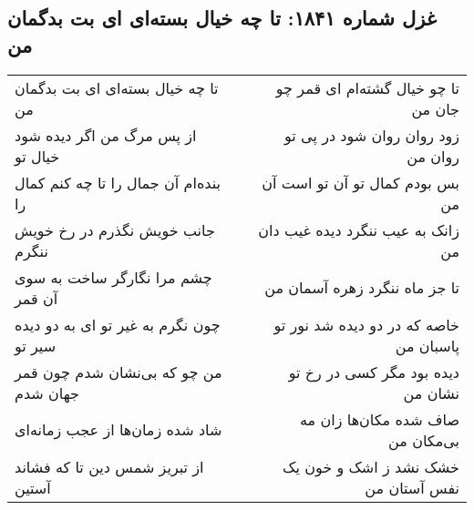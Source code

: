 \begin{center}
\section*{غزل شماره ۱۸۴۱: تا چه خیال بسته‌ای ای بت بدگمان من}
\label{sec:1841}
\begin{longtable}{l p{0.5cm} r}
تا چه خیال بسته‌ای ای بت بدگمان من
&&
تا چو خیال گشته‌ام ای قمر چو جان من
\\
از پس مرگ من اگر دیده شود خیال تو
&&
زود روان روان شود در پی تو روان من
\\
بنده‌ام آن جمال را تا چه کنم کمال را
&&
بس بودم کمال تو آن تو است آن من
\\
جانب خویش نگذرم در رخ خویش ننگرم
&&
زانک به عیب ننگرد دیده غیب دان من
\\
چشم مرا نگارگر ساخت به سوی آن قمر
&&
تا جز ماه ننگرد زهره آسمان من
\\
چون نگرم به غیر تو ای به دو دیده سیر تو
&&
خاصه که در دو دیده شد نور تو پاسبان من
\\
من چو که بی‌نشان شدم چون قمر جهان شدم
&&
دیده بود مگر کسی در رخ تو نشان من
\\
شاد شده زمان‌ها از عجب زمانه‌ای
&&
صاف شده مکان‌ها زان مه بی‌مکان من
\\
از تبریز شمس دین تا که فشاند آستین
&&
خشک نشد ز اشک و خون یک نفس آستان من
\\
\end{longtable}
\end{center}
